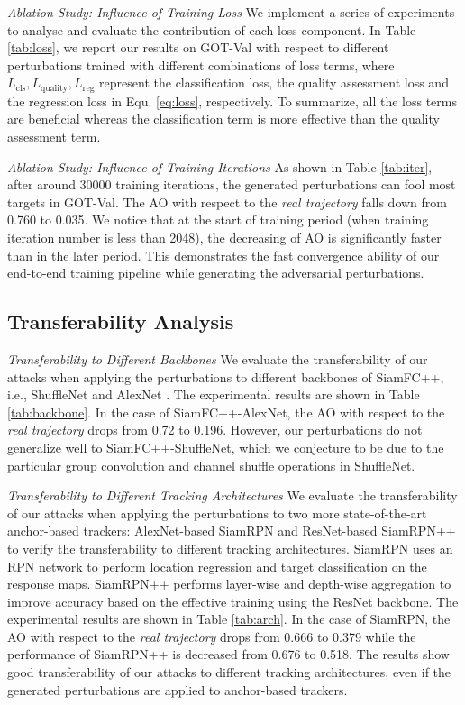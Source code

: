 \documentclass{article}
\newcommand{\ie}{i.e.}
\begin{document}
\textit{Ablation Study: Influence of Training Loss} We implement a series of experiments to analyse and evaluate the contribution of each loss component.
In Table \ref{tab:loss}, we report our results on GOT-Val with respect to different perturbations trained with different combinations of loss terms, where $L_{\text{cls}}, L_{\text{quality}}, L_{\text{reg}}$ represent the classification loss, the quality assessment loss and the regression loss in Equ. \ref{eq:loss}, respectively.
To summarize, all the loss terms are beneficial whereas the classification term is more effective than the quality assessment term.

\textit{Ablation Study: Influence of Training Iterations} As shown in Table \ref{tab:iter}, after around 30000 training iterations, the generated perturbations can fool most targets in GOT-Val. The AO with respect to the \textit{real trajectory} falls down from 0.760 to 0.035. We notice that at the start of training period (when training iteration number is less than 2048), the decreasing of AO is significantly faster than in the later period. This demonstrates the fast convergence ability of our end-to-end training pipeline while generating the adversarial perturbations.

\subsection{Transferability Analysis}

\textit{Transferability to Different Backbones} We evaluate the transferability of our attacks when applying the perturbations to different backbones of SiamFC++, \ie, ShuffleNet \cite{ShuffleNet} and AlexNet \cite{AlexNet}.
The experimental results are shown in Table \ref{tab:backbone}. In the case of SiamFC++-AlexNet, the AO with respect to the \textit{real trajectory} drops from 0.72 to 0.196. However, our perturbations do not generalize well to SiamFC++-ShuffleNet, which we conjecture to be due to the particular group convolution and channel shuffle operations in ShuffleNet.

\textit{Transferability to Different Tracking Architectures} We evaluate the transferability of our attacks when applying the perturbations to two more state-of-the-art anchor-based trackers: AlexNet-based SiamRPN \cite{SiamRPN} and ResNet-based SiamRPN++ \cite{SiamRPN++} to verify the transferability to different tracking architectures.
SiamRPN uses an RPN network to perform location regression and target classification on the response maps. SiamRPN++ performs layer-wise and depth-wise aggregation to improve accuracy based on the effective training using the ResNet backbone. The experimental results are shown in Table \ref{tab:arch}. In the case of SiamRPN, the AO with respect to the \textit{real trajectory} drops from 0.666 to 0.379 while the performance of SiamRPN++ is decreased from 0.676 to 0.518. The results show good transferability of our attacks to different tracking architectures, even if the generated perturbations are applied to anchor-based trackers.
\end{document}
